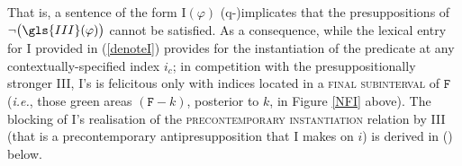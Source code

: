 That is, a sentence of the form \gls{I}$ (\varphi) $ ({\sc q}-)implicates that the presuppositions of $ \neg\big(\gls{III}(\varphi)\big) $ cannot be satisfied. As a consequence, while the lexical entry for \gls{I} provided in (\ref{denoteI}) provides for the instantiation of the predicate at any contextually-specified index $ i_c $; in competition with the presuppositionally stronger \gls{III}, \gls{I}'s is felicitous only with indices located in a \textsc{final subinterval} of $ \mathtt{F} $ (\textit{i.e.}, those green areas $ (\texttt{F}-k) $, posterior to $ k $, in Figure \ref{NFI} above). The blocking of \gls{I}'s realisation of the \textsc{precontemporary instantiation}  relation by \gls{III} (that is a precontemporary antipresupposition that \gls{I} makes on $ i $) is derived in (\nextx) below.
%
%
%
%


